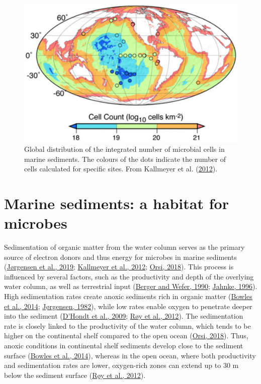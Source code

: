\documentclass[
  12 pt,
]{book}
\begin{document}
\begin{figure}

{\centering \includegraphics[width=0.7\linewidth]{figures/kallmeyer2012} 

}

\caption{Global distribution of the integrated number of microbial cells in marine sediments. The colours of the dots indicate the number of cells calculated for specific sites. From Kallmeyer et al. (\protect\hyperlink{ref-Kallmeyer2012}{2012}).}\label{fig:kallmeyer2012}
\end{figure}



\hypertarget{section-habitat}{%
\section{Marine sediments: a habitat for microbes}\label{section-habitat}}

Sedimentation of organic matter from the water column serves as the primary source of electron donors and thus energy for microbes in marine sediments (\protect\hyperlink{ref-Jorgensen2019}{Jørgensen et al., 2019}; \protect\hyperlink{ref-Kallmeyer2012}{Kallmeyer et al., 2012}; \protect\hyperlink{ref-Orsi2018}{Orsi, 2018}). This process is influenced by several factors, such as the productivity and depth of the overlying water column, as well as terrestrial input (\protect\hyperlink{ref-Berger1990}{Berger and Wefer, 1990}; \protect\hyperlink{ref-Jahnke1996}{Jahnke, 1996}). High sedimentation rates create anoxic sediments rich in organic matter (\protect\hyperlink{ref-Bowles2014}{Bowles et al., 2014}; \protect\hyperlink{ref-Jorgensen1982}{Jørgensen, 1982}), while low rates enable oxygen to penetrate deeper into the sediment (\protect\hyperlink{ref-DHondt2009}{D'Hondt et al., 2009}; \protect\hyperlink{ref-Roy2012}{Røy et al., 2012}). The sedimentation rate is closely linked to the productivity of the water column, which tends to be higher on the continental shelf compared to the open ocean (\protect\hyperlink{ref-Orsi2018}{Orsi, 2018}). Thus, anoxic conditions in continental shelf sediments develop close to the sediment surface (\protect\hyperlink{ref-Bowles2014}{Bowles et al., 2014}), whereas in the open ocean, where both productivity and sedimentation rates are lower, oxygen-rich zones can extend up to 30 \si{\m} below the sediment surface (\protect\hyperlink{ref-Roy2012}{Røy et al., 2012}).
\end{document}
